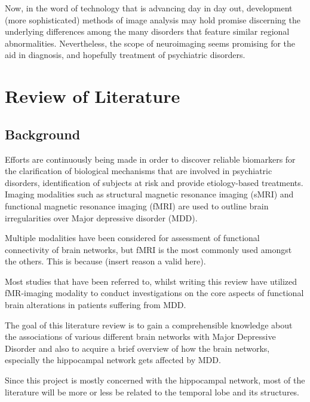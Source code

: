 \documentclass{article}
\begin{document}
Now, in the word of technology that is advancing day in day out,
development (more sophisticated) methods of image analysis may hold
promise discerning the underlying differences among the many disorders
that feature similar regional abnormalities. Nevertheless, the scope
of neuroimaging seems promising for the aid in diagnosis, and
hopefully treatment of psychiatric disorders.
\newpage

\section{Review of Literature}

\subsection{Background}

Efforts are continuously being made in order to discover reliable
biomarkers for the clarification of biological mechanisms that are
involved in psychiatric disorders, identification of subjects at risk
and provide etiology-based treatments. Imaging modalities such as
structural magnetic resonance imaging (sMRI) and functional magnetic
resonance imaging (fMRI) are used to outline brain irregularities over
Major depressive disorder (MDD).

Multiple modalities have been considered for assessment of functional
connectivity of brain networks, but fMRI is the most commonly used
amongst the others. This is because (insert reason a valid here).

Most studies that have been referred to, whilst writing this review
have utilized fMR-imaging modality to conduct investigations on the
core aspects of functional brain alterations in patients suffering
from MDD.

The goal of this literature review is to gain a comprehensible
knowledge about the associations of various different brain networks
with Major Depressive Disorder and also to acquire a brief overview of
how the brain networks, especially the hippocampal network gets
affected by MDD.

Since this project is mostly concerned with the hippocampal network,
most of the literature will be more or less be related to the temporal
lobe and its structures.

\end{document}
